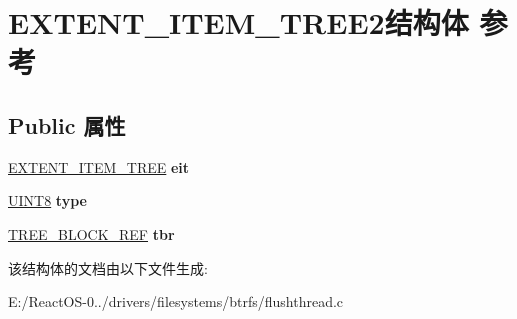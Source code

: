 \hypertarget{struct_e_x_t_e_n_t___i_t_e_m___t_r_e_e2}{}\section{E\+X\+T\+E\+N\+T\+\_\+\+I\+T\+E\+M\+\_\+\+T\+R\+E\+E2结构体 参考}
\label{struct_e_x_t_e_n_t___i_t_e_m___t_r_e_e2}
\subsection*{Public 属性}
\begin{DoxyCompactItemize}
\item 
\mbox{\label{struct_e_x_t_e_n_t___i_t_e_m___t_r_e_e2_a7555dac31cfed666ced6b4a45202dfe8}} 
\hyperlink{struct_e_x_t_e_n_t___i_t_e_m___t_r_e_e}{E\+X\+T\+E\+N\+T\+\_\+\+I\+T\+E\+M\+\_\+\+T\+R\+EE} {\bfseries eit}
\item 
\mbox{\label{struct_e_x_t_e_n_t___i_t_e_m___t_r_e_e2_aad8627518322cfa6945ccc9740c32dcb}} 
\hyperlink{_processor_bind_8h_ab27e9918b538ce9d8ca692479b375b6a}{U\+I\+N\+T8} {\bfseries type}
\item 
\mbox{\label{struct_e_x_t_e_n_t___i_t_e_m___t_r_e_e2_a7067bfe7a2bb51ff19752367d5dabfba}} 
\hyperlink{struct_t_r_e_e___b_l_o_c_k___r_e_f}{T\+R\+E\+E\+\_\+\+B\+L\+O\+C\+K\+\_\+\+R\+EF} {\bfseries tbr}
\end{DoxyCompactItemize}


该结构体的文档由以下文件生成\+:\begin{DoxyCompactItemize}
\item 
E\+:/\+React\+O\+S-\/0../drivers/filesystems/btrfs/flushthread.\+c\end{DoxyCompactItemize}
